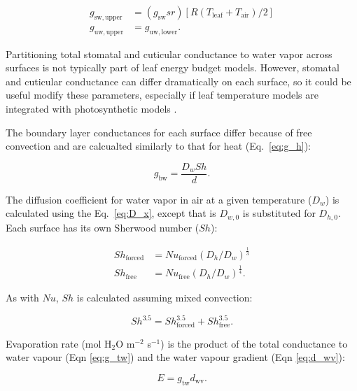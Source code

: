 \documentclass[11pt, oneside]{article}
\begin{document}
\begin{align}
  g_\mathrm{sw,upper} & = (g_\mathrm{sw} \mathit{sr}) [R (T_\mathrm{leaf} + T_\mathrm{air}) / 2] \\
  g_\mathrm{uw,upper} & = g_\mathrm{uw,lower}.
\end{align}

Partitioning total stomatal and cuticular conductance to water vapor across surfaces is not typically part of leaf energy budget models. However, stomatal \citep{Muir_2015} and cuticular \citep{Karbulkova_etal_2008} conductance can differ dramatically on each surface, so it could be useful modify these parameters, especially if leaf temperature models are integrated with photosynthetic models \citep{Muir_2019c}.

The boundary layer conductances for each surface differ because of free convection \citep{Foster_Smith_1986} and are calcualted similarly to that for heat (Eq.~\ref{eq:g_h}):

\begin{equation}
  g_\mathrm{bw} = \frac{D_w \mathit{Sh}}{d}.
\end{equation}

The diffusion coefficient for water vapor in air at a given temperature ($D_w$) is calculated using the Eq.~\ref{eq:D_x}, except that is $D_{w,0}$ is substituted for $D_{h,0}$. Each surface has its own Sherwood number ($\mathit{Sh}$):

\begin{align}
  \mathit{Sh}_\mathrm{forced} & = \mathit{Nu}_\mathrm{forced} (D_h / D_w) ^ \frac{1}{3} \\
  \mathit{Sh}_\mathrm{free} & = \mathit{Nu}_\mathrm{free} (D_h / D_w) ^ \frac{1}{4}.
\end{align}

As with $\mathit{Nu}$, $\mathit{Sh}$ is calculated assuming mixed convection:

\begin{equation}
  \label{eq:sherwood}
  \mathit{Sh} ^ {3.5} = \mathit{Sh}_\mathrm{forced} ^ {3.5} + \mathit{Sh}_\mathrm{free} ^ {3.5}.
\end{equation}

Evaporation rate (mol H$_2$O m$^{-2}$ s$^{-1}$) is the product of the total conductance to water vapour (Eqn \ref{eq:g_tw}) and the water vapour gradient (Eqn \ref{eq:d_wv}):

\begin{equation}
  E = g_\mathrm{tw} d_\mathrm{wv}.
\end{equation}
\end{document}
